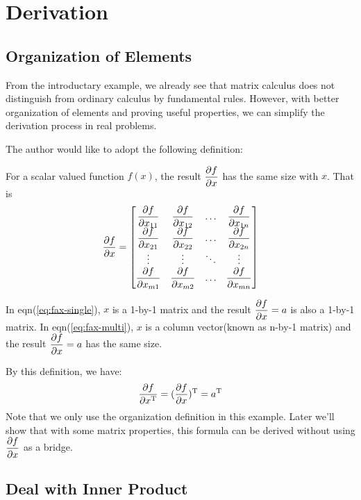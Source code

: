 \section{Derivation}
\label{sec:derivation}

\subsection{Organization of Elements}
From the introductary example, we already see that matrix calculus 
does not distinguish from ordinary calculus by fundamental rules. 
However, with better organization of elements and 
proving useful properties, we can simplify the derivation process 
in real problems. 

The author would like to adopt the following definition:
\begin{mydef}
	\label{def:org}
	For a scalar valued function $f(x)$, the result $\dfrac{\partial f}{\partial x}$
	has the same size with $x$. That is 
	\begin{equation}
		\dfrac{\partial f}{\partial x} = 
		\left[
		\begin{matrix}
			\dfrac{\partial f}{\partial x_{11}} & \dfrac{\partial f}{\partial x_{12}} & \ldots &\dfrac{\partial f}{\partial x_{1n}}\\
			\dfrac{\partial f}{\partial x_{21}} & \dfrac{\partial f}{\partial x_{22}} & \ldots &\dfrac{\partial f}{\partial x_{2n}}\\
			\vdots & \vdots & \ddots & \vdots \\
			\dfrac{\partial f}{\partial x_{m1}} & \dfrac{\partial f}{\partial x_{m2}} & \ldots &\dfrac{\partial f}{\partial x_{mn}}\\
		\end{matrix}
		\right]
	\end{equation}
\end{mydef}

In eqn(\ref{eq:fax-single}), $x$ is a 1-by-1 matrix and the result
$\dfrac{\partial f}{\partial x}=a$ is also a 1-by-1 matrix. In eqn(\ref{eq:fax-multi}), 
$x$ is a column vector(known as n-by-1 matrix) and the result
$\dfrac{\partial f}{\partial x}=a$ has the same size. 

\begin{myex}
\label{ex:tran_x}
By this definition, we have:
\begin{equation}
	\dfrac{\partial f}{\partial x^\mathrm{T}} = (\dfrac{\partial f}{\partial x})^\mathrm{T} = a^\mathrm{T}
\end{equation}
Note that we only use the organization definition in this example. 
Later we'll show that with some matrix properties, this formula 
can be derived without using $\dfrac{\partial f}{\partial x}$ as a bridge. 
\end{myex}

\subsection{Deal with Inner Product}

